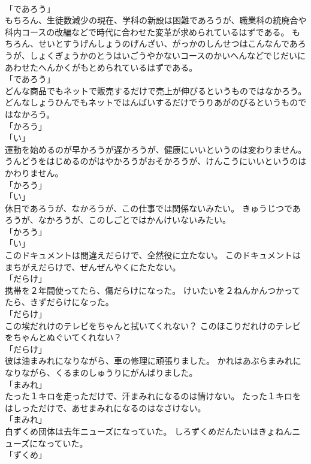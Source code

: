 \documentclass[8pt]{extreport}
\begin{document}
\begin{CJK}{UTF8}{min}
\\	「であろう」 
\\	もちろん、生徒数減少の現在、学科の新設は困難であろうが、職業科の統廃合や科内コースの改編などで時代に合わせた変革が求められているはずである。	もちろん、せいとすうげんしょうのげんざい、がっかのしんせつはこんなんであろうが、しょくぎょうかのとうはいごうやかないコースのかいへんなどでじだいにあわせたへんかくがもとめられているはずである。	
\\	「であろう」 
\\	どんな商品でもネットで販売するだけで売上が伸びるというものではなかろう。	どんなしょうひんでもネットではんばいするだけでうりあがのびるというものではなかろう。	
\\	「かろう」 
\\	「い」 
\\	運動を始めるのが早かろうが遅かろうが、健康にいいというのは変わりません。	うんどうをはじめるのがはやかろうがおそかろうが、けんこうにいいというのはかわりません。	
\\	「かろう」 
\\	「い」 
\\	休日であろうが、なかろうが、この仕事では関係ないみたい。	きゅうじつであろうが、なかろうが、このしごとではかんけいないみたい。	
\\	「かろう」 
\\	「い」 
\\	このドキュメントは間違えだらけで、全然役に立たない。	このドキュメントはまちがえだらけで、ぜんぜんやくにたたない。	
\\	「だらけ」 
\\	携帯を２年間使ってたら、傷だらけになった。	けいたいを２ねんかんつかってたら、きずだらけになった。	
\\	「だらけ」 
\\	この埃だれけのテレビをちゃんと拭いてくれない？	このほこりだれけのテレビをちゃんとぬぐいてくれない？	
\\	「だらけ」 
\\	彼は油まみれになりながら、車の修理に頑張りました。	かれはあぶらまみれになりながら、くるまのしゅうりにがんばりました。	
\\	「まみれ」 
\\	たった１キロを走っただけで、汗まみれになるのは情けない。	たった１キロをはしっただけで、あせまみれになるのはなさけない。	
\\	「まみれ」 
\\	白ずくめ団体は去年ニューズになっていた。	しろずくめだんたいはきょねんニューズになっていた。	
\\	「ずくめ」 

\end{CJK}
\end{document}
